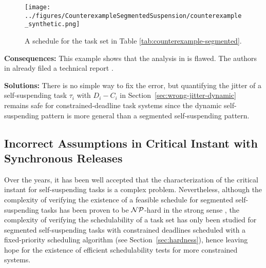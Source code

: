 \begin{figure}[t]
\begin{center}
\texttt{[image: ../figures/CounterexampleSegmentedSuspension/counterexample\_synthetic.png]}
\end{center}
\caption{A schedule for the task set in Table  \ref{tab:counterexample-segmented}. }
\label{fig:counterexample-segmented}
\end{figure}


{\bf Consequences:} This example shows that the analysis in \cite{RTCSA-BletsasA05} is flawed.  The authors in \cite{RTCSA-BletsasA05}  already filed a technical report \cite{BletsasReport2015}.

{\bf Solutions:} There is no simple way to fix the error, but quantifying the jitter of a self-suspending task $\tau_i$ with $D_i-C_i$ in Section~\ref{sec:wrong-jitter-dynamic}  remains safe for constrained-deadline task systems since the dynamic self-suspending pattern is more general than a segmented self-suspending pattern.

\subsection{Incorrect Assumptions in Critical Instant with Synchronous Releases}
\label{sec:wrong-critical}

Over the years, it has been well accepted that the characterization of the critical instant for self-suspending tasks is a complex problem. Nevertheless, although the complexity of verifying the existence of a feasible schedule for segmented self-suspending tasks has been proven to be ${\cal NP}$-hard in the strong sense \cite{Ridouard_2004}, the complexity of verifying the schedulability of a task set has only been studied for segmented self-suspending tasks with constrained deadlines scheduled with a fixed-priority scheduling algorithm (see Section~\ref{sec:hardness}), hence leaving hope for the existence of efficient schedulability tests for more constrained systems. 

